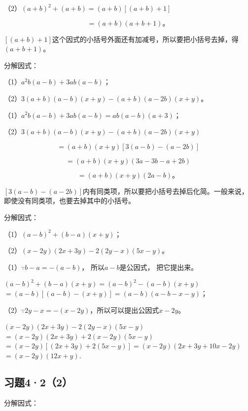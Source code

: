 （2）\((a + b)^2 + (a + b) = (a + b)[(a + b) + 1]\)

\[
= (a + b) (a + b + 1)\text{。}
\]

\([(a + b) + 1]\)这个因式的小括号外面还有加减号，所以要把小括号去掉，得\((a + b + 1)\)。

 分解因式：

（1）\(a^2 b(a - b) + 3ab(a - b)\)；

（2）\(3(a + b)(a - b)(x + y) - (a + b)(a - 2b)(x + y)\)。

 （1）\(a^2 b(a - b) + 3ab(a - b) = ab(a - b)(a + 3)\)；

（2）\(3(a + b)(a - b)(x + y) - (a + b)(a - 2b)(x + y)\)

\[
= (a + b) (x + y) [ 3 (a - b) - (a - 2 b) ]
\]

\[
= (a + b) (x + y) (3 a - 3 b - a + 2 b)
\]

\[
= (a + b) (x + y) (2 a - b)\text{。}
\]

\([3(a - b) - (a - 2b)]\)内有同类项，所以要把小括号去掉后化简。一般来说，即使没有同类项，也要去掉其中的小括号。

 分解因式：

（1）\((a - b)^2 + (b - a)(x + y)\)；

（2）\((x - 2y)(2x + 3y) - 2(2y - x)(5x - y)\)。

 （1）\(\because b - a = -(a - b)\)，
所以\(a - b\)是公因式， 把它提出来。

\((a - b)^2 + (b - a)(x + y) = (a - b)^2 - (a - b)(x + y)\)\(= (a - b)[(a - b) - (x + y)]\)\(= (a - b)(a - b - x - y)\)；

（2）\(\because 2y - x = -(x - 2y)\)，所以可以提出公因式\(x - 2y\)。

\((x - 2y)(2x + 3y) - 2(2y - x)(5x - y)\)\(= (x - 2y)(2x + 3y) + 2(x - 2y)(5x - y)\)\(= (x - 2y)[(2x + 3y) + 2(5x - y)]\)\(= (x - 2y)(2x + 3y + 10x - 2y)\)\(= (x - 2y)(12x + y).\)

\subsection{习题4·2（2）}

分解因式：

